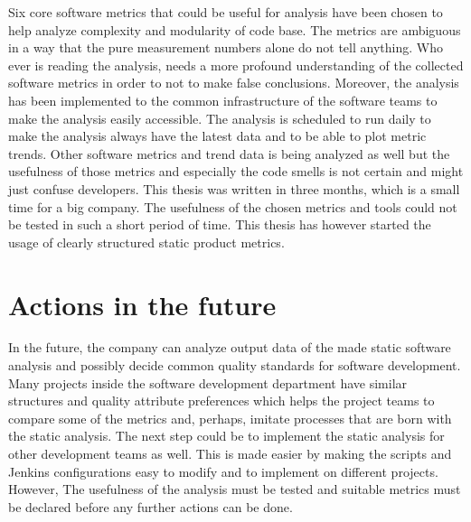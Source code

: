 Six core software metrics that could be useful for analysis have been chosen to help analyze complexity and modularity of code base. The metrics are ambiguous in a way that the pure measurement numbers alone do not tell anything. Who ever is reading the analysis, needs a more profound understanding of the collected software metrics in order to not to make false conclusions. Moreover, the analysis has been implemented to the common infrastructure of the software teams to make the analysis easily accessible. The analysis is scheduled to run daily to make the analysis always have the latest data and to be able to plot metric trends. Other software metrics and trend data is being analyzed as well but the usefulness of those metrics and especially the code smells is not certain and might just confuse developers. This thesis was written in three months, which is a small time for a big company. The usefulness of the chosen metrics and tools could not be tested in such a short period of time. This thesis has however started the usage of clearly structured static product metrics.

\section{Actions in the future}


In the future, the company can analyze output data of the made static software analysis and possibly decide common quality standards for software development. Many projects inside the software development department have similar structures and quality attribute preferences which helps the project teams to compare some of the metrics and, perhaps, imitate processes that are born with the static analysis. The next step could be to implement the static analysis for other development teams as well. This is made easier by making the scripts and Jenkins configurations easy to modify and to implement on different projects. However, The usefulness of the analysis must be tested and suitable metrics must be declared before any further actions can be done.







